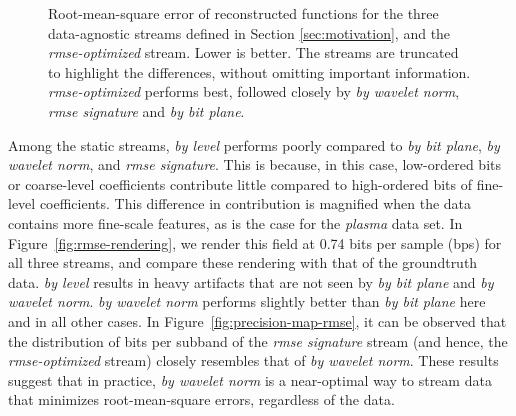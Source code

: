 \begin{figure}[h]
  \caption{Root-mean-square error of reconstructed functions for the three data-agnostic streams
  defined in Section \ref{sec:motivation}, and the \emph{rmse-optimized} stream. Lower is better.
  The streams are truncated to highlight the differences, without omitting important information.
  \emph{rmse-optimized} performs best, followed closely by \emph{by wavelet norm}, \emph{rmse
  signature} and \emph{by bit plane}.}
 	\label{fig:rmse-optimized}
\end{figure}

Among the static streams, \emph{by level} performs poorly compared to \emph{by bit plane}, \emph{by
wavelet norm}, and \emph{rmse signature}. This is because, in this case, low-ordered bits or
coarse-level coefficients contribute little compared to high-ordered bits of fine-level
coefficients. This difference in contribution is magnified when the data contains more fine-scale
features, as is the case for the \emph{plasma} data set. In Figure~\ref{fig:rmse-rendering}, we
render this field at 0.74 bits per sample (bps) for all three streams, and compare these rendering
with that of the groundtruth data. \emph{by level} results in heavy artifacts that are not seen by
\emph{by bit plane} and \emph{by wavelet norm}. \emph{by wavelet norm} performs slightly better than
\emph{by bit plane} here and in all other cases. In Figure~\ref{fig:precision-map-rmse}, it can be
observed that the distribution of bits per subband of the \emph{rmse signature} stream (and hence,
the \emph{rmse-optimized} stream) closely resembles that of \emph{by wavelet norm}. These results
suggest that in practice, \emph{by wavelet norm} is a near-optimal way to stream data that minimizes
root-mean-square errors, regardless of the data.

